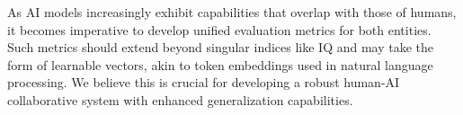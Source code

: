 As AI models increasingly exhibit capabilities that overlap with those of humans, it becomes imperative to develop unified evaluation metrics for both entities. Such metrics should extend beyond singular indices like IQ and may take the form of learnable vectors, akin to token embeddings used in natural language processing. 
We believe this is crucial for developing a robust human-AI collaborative system with enhanced generalization capabilities.